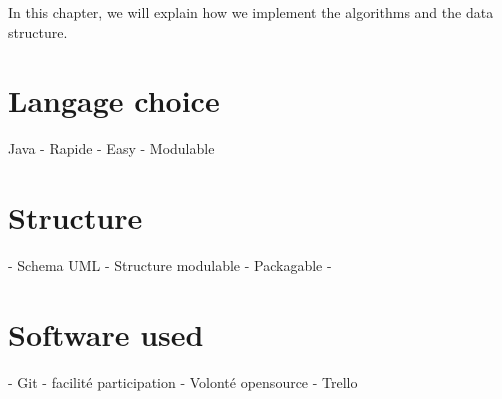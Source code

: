 In this chapter, we will explain how we implement the algorithms and the data structure. 


\section{Langage choice}

Java 
	- Rapide
	- Easy
	- Modulable

\section{Structure}

- Schema UML
	- Structure modulable
	- Packagable
	- 

\section{Software used}

	- Git
		- facilité participation
		- Volonté opensource
	- Trello